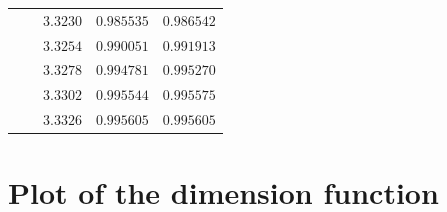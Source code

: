 \documentclass[10pt]{amsart}
\numberwithin{equation}{section}
\theoremstyle{definition}
\begin{document}
\begin{longtable}{|c|c|c|c|c|}
   &  &  $3.3230 $  &  $  0.985535 $  &  $  0.986542 $ \\
   &  &  $3.3254 $  &  $  0.990051 $  &  $  0.991913 $ \\
   &  &  $3.3278 $  &  $  0.994781 $  &  $  0.995270 $ \\
   &  &  $3.3302 $  &  $  0.995544 $  &  $  0.995575 $ \\
   &  &  $3.3326 $  &  $  0.995605 $  &  $  0.995605 $ \\
 \hline
\end{longtable}

\newpage

\section{Plot of the dimension function}
\label{ap:plot}
\end{document}
